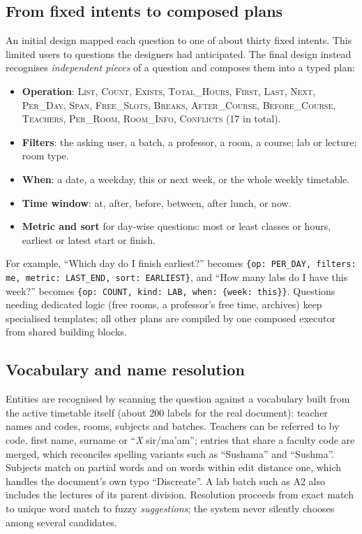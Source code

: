\documentclass[conference]{IEEEtran}
\begin{document}
\subsection{From fixed intents to composed plans}
An initial design mapped each question to one of about thirty fixed intents. This limited users to
questions the designers had anticipated. The final design instead recognises \emph{independent pieces}
of a question and composes them into a typed plan:
\begin{itemize}
\item \textbf{Operation}: \textsc{List}, \textsc{Count}, \textsc{Exists}, \textsc{Total\_Hours},
      \textsc{First}, \textsc{Last}, \textsc{Next}, \textsc{Per\_Day}, \textsc{Span},
      \textsc{Free\_Slots}, \textsc{Breaks}, \textsc{After\_Course}, \textsc{Before\_Course},
      \textsc{Teachers}, \textsc{Per\_Room}, \textsc{Room\_Info}, \textsc{Conflicts} (17 in total).
\item \textbf{Filters}: the asking user, a batch, a professor, a room, a course; lab or lecture; room type.
\item \textbf{When}: a date, a weekday, this or next week, or the whole weekly timetable.
\item \textbf{Time window}: at, after, before, between, after lunch, or now.
\item \textbf{Metric and sort} for day-wise questions: most or least classes or hours, earliest or latest
      start or finish.
\end{itemize}
For example, ``Which day do I finish earliest?'' becomes
\texttt{\{op: PER\_DAY, filters: me, metric: LAST\_END, sort: EARLIEST\}}, and ``How many labs do I have this
week?'' becomes \texttt{\{op: COUNT, kind: LAB, when: \{week: this\}\}}. Questions needing dedicated logic
(free rooms, a professor's free time, archives) keep specialised templates; all other plans are compiled
by one composed executor from shared building blocks.

\subsection{Vocabulary and name resolution}
Entities are recognised by scanning the question against a vocabulary built from the active timetable
itself (about 200 labels for the real document): teacher names and codes, rooms, subjects and batches.
Teachers can be referred to by code, first name, surname or ``\emph{X} sir/ma'am''; entries that share a
faculty code are merged, which reconciles spelling variants such as ``Sushama'' and ``Sushma''. Subjects
match on partial words and on words within edit distance one, which handles the document's own typo
``Discreate''. A lab batch such as A2 also includes the lectures of its parent division. Resolution
proceeds from exact match to unique word match to fuzzy \emph{suggestions}; the system never silently
chooses among several candidates.
\end{document}
